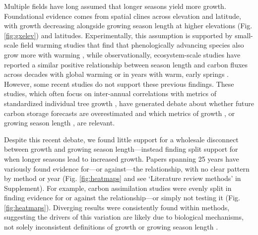 \documentclass[11pt]{article}
\begin{document}
Multiple fields have long assumed that longer seasons yield more growth. Foundational evidence comes from spatial clines across elevation and latitude, with growth decreasing alongside growing season length at higher elevations (Fig. \ref{fig:gxelev}) and latitudes. Experimentally, this assumption is supported by small-scale field warming studies that find that phenologically advancing species also grow more with warming \citep[][]{Cleland:2012}, while observationally, ecosystem-scale studies have reported a similar positive relationship between season length and carbon fluxes across decades with global warming \citep{keenan2014net} or in years with warm, early springs \citep{chen1999effects}. However, some recent studies do not support these previous findings.  These studies, which often focus on inter-annual correlations with metrics of standardized individual tree growth \citep{dow2022warm,silvestro2023longer}, have generated debate about whether future carbon storage forecasts are overestimated and which metrics of growth \citep{green2022limits}, or growing season length \citep{korner2023four}, are relevant.

Despite this recent debate, we found little support for a wholesale disconnect between growth and growing season length---instead finding split support for when longer seasons lead to increased growth. Papers spanning 25 years have variously found evidence for---or against---the relationship, with no clear pattern by method or year (Fig. \ref{fig:heatmaps} and see `Literature review methods' in Supplement). For example, carbon assimilation studies were evenly split in finding evidence for or against the relationship---or simply not testing it (Fig. \ref{fig:heatmaps}). Diverging results were consistently found within methods, suggesting the drivers of this variation are likely due to biological mechanisms, not solely inconsistent definitions of growth or growing season length \citep[as some, e.g. ][have recently suggested]{green2022limits,korner2023four}. 
\end{document}
